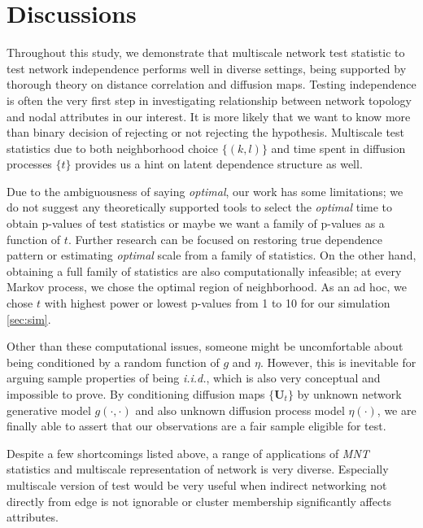 \documentclass[12pt]{article}
\theoremstyle{definition}
\begin{document}
	
\section{Discussions}
\label{sec:discussion}
	
Throughout this study, we demonstrate that multiscale network test statistic to test network independence performs well in diverse settings, being supported by thorough theory on distance correlation and diffusion maps. 
Testing independence is often the very first step in investigating relationship between network topology and nodal attributes in our interest. It is more likely that we want to know more than binary decision of rejecting or not rejecting the hypothesis. Multiscale test statistics due to both neighborhood choice $\{ (k,l)  \}$ and time spent in diffusion processes $\{ t \}$ provides us a hint on latent dependence structure as well.  
	
Due to the ambiguousness of saying \textit{optimal}, our work has some limitations; we do not suggest any theoretically supported tools to select the \textit{optimal} time to obtain p-values of test statistics or maybe we want a family of p-values as a function of $t$. Further research can be focused on restoring true dependence pattern or estimating \textit{optimal} scale from a family of statistics. On the other hand, obtaining a full family of statistics are also computationally infeasible; at every Markov process, we chose the optimal region of neighborhood. As an ad hoc, we chose $t$ with highest power or lowest p-values from 1 to 10 for our simulation \ref{sec:sim}.  

Other than these computational issues, someone might be uncomfortable about being conditioned by a random function of $g$ and $\eta$.  However, this is inevitable for arguing sample properties of being \textit{i.i.d.}, which is also very conceptual and impossible to prove. By conditioning diffusion maps $\{ \mathbf{U}_{t} \}$ by unknown network generative model $g(\cdot, \cdot)$ and also unknown diffusion process model $\eta(\cdot)$, we are finally able to assert that our observations are a fair sample eligible for test. 
	
Despite a few shortcomings listed above, a range of applications of \textit{MNT} statistics and multiscale representation of network is very diverse. Especially multiscale version of test would be very useful when indirect networking not directly from edge is not ignorable or cluster membership significantly affects attributes. 
	
\end{document}
